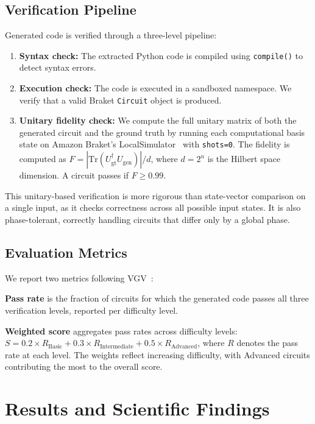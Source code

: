 \documentclass[conference]{IEEEtran}
\begin{document}
\subsection{Verification Pipeline}

Generated code is verified through a three-level pipeline:

\begin{enumerate}
    \item \textbf{Syntax check:} The extracted Python code is compiled using \texttt{compile()} to detect syntax errors.
    \item \textbf{Execution check:} The code is executed in a sandboxed namespace. We verify that a valid Braket \texttt{Circuit} object is produced.
    \item \textbf{Unitary fidelity check:} We compute the full unitary matrix of both the generated circuit and the ground truth by running each computational basis state on Amazon Braket's LocalSimulator~\cite{braket} with \texttt{shots=0}. The fidelity is computed as $F = |\mathrm{Tr}(U_{\text{gt}}^\dagger U_{\text{gen}})| / d$, where $d = 2^n$ is the Hilbert space dimension. A circuit passes if $F \geq 0.99$.
\end{enumerate}

This unitary-based verification is more rigorous than state-vector comparison on a single input, as it checks correctness across all possible input states. It is also phase-tolerant, correctly handling circuits that differ only by a global phase.

\subsection{Evaluation Metrics}

We report two metrics following VGV~\cite{wong2024vgv}:

\textbf{Pass rate} is the fraction of circuits for which the generated code passes all three verification levels, reported per difficulty level.

\textbf{Weighted score} aggregates pass rates across difficulty levels: $S = 0.2 \times R_{\text{Basic}} + 0.3 \times R_{\text{Intermediate}} + 0.5 \times R_{\text{Advanced}}$, where $R$ denotes the pass rate at each level. The weights reflect increasing difficulty, with Advanced circuits contributing the most to the overall score.

\section{Results and Scientific Findings}
\end{document}

